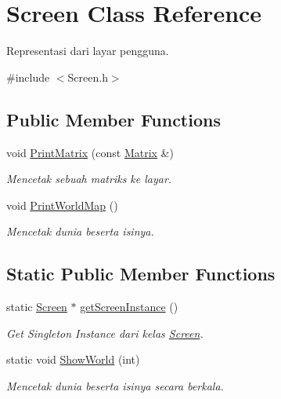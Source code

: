 \hypertarget{class_screen}{}\section{Screen Class Reference}
\label{class_screen}


Representasi dari layar pengguna.  




{\ttfamily \#include $<$Screen.\+h$>$}

\subsection*{Public Member Functions}
\begin{DoxyCompactItemize}
\item 
void \hyperlink{class_screen_aebdf6e729abb754cb4c6a2b65ff44d84}{Print\+Matrix} (const \hyperlink{class_matrix}{Matrix} \&)
\begin{DoxyCompactList}\small\item\em Mencetak sebuah matriks ke layar. \end{DoxyCompactList}\item 
void \hyperlink{class_screen_ae87ec3a6c85d019370bf5a73d38e4f7e}{Print\+World\+Map} ()
\begin{DoxyCompactList}\small\item\em Mencetak dunia beserta isinya. \end{DoxyCompactList}\end{DoxyCompactItemize}
\subsection*{Static Public Member Functions}
\begin{DoxyCompactItemize}
\item 
static \hyperlink{class_screen}{Screen} $\ast$ \hyperlink{class_screen_a6600999f98834ff40a2a42d291867db2}{get\+Screen\+Instance} ()
\begin{DoxyCompactList}\small\item\em Get Singleton Instance dari kelas \hyperlink{class_screen}{Screen}. \end{DoxyCompactList}\item 
static void \hyperlink{class_screen_a116d9815de49d2a74bc3c558e4322130}{Show\+World} (int)
\begin{DoxyCompactList}\small\item\em Mencetak dunia beserta isinya secara berkala. \end{DoxyCompactList}\end{DoxyCompactItemize}


